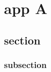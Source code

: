 \chapter{app A}\label{app:A}

\section{section}\label{app:section}
\subsection{subsection}\label{app:subsection}